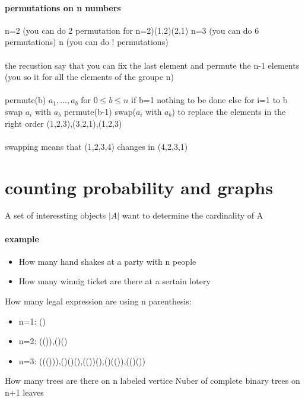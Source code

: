 \documentclass[a4paper,10pt]{article}
\begin{document}
\paragraph{permutations on n numbers}
n=2 (you can do 2 permutation for n=2)(1,2)(2,1)
\newline
n=3 (you can do 6 permutations)
\newline
n (you can do ! permutations)
\paragraph{}
the recustion say that you can fix the last element and permute the n-1 elements (you so it for all the elements of the groupe n)
\paragraph{}
permute(b) $a_1,...,a_b$ for $0\leq b \leq n$
\newline
if b=1 nothing to be done
\newline
else
\newline
for i=1 to b
\newline
    swap $a_i$ with $a_b$
\newline
    permute(b-1)
\newline
    swap($a_i$ with $a_b$) to replace the elements in the right order (1,2,3),(3,2,1),(1,2,3)
\paragraph{}
swapping means that (1,2,3,4) changes in (4,2,3,1)
\section{counting probability and graphs}
A set of interessting objects
\newline
$|A|$ want to determine the cardinality of A
\paragraph{example}
\begin{itemize}
 \item How many hand shakes at a party with n people
 \item How many winnig ticket are there at a sertain lotery
\end{itemize}
How many legal expression are using n parenthesis:
\begin{itemize}
 \item n=1: ()
 \item n=2: (()),()()
 \item n=3: ((())),()()(),(())(),()(()),(()())
\end{itemize}
How many trees are there on n labeled vertice
\newline
Nuber of complete binary trees on n+1 leaves
\end{document}
